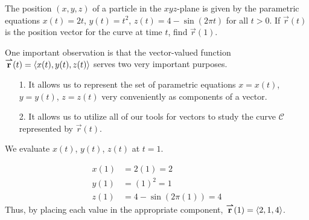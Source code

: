 \documentclass[noauthor, handout]{ximera}
\begin{document}
\begin{problem}
The position $(x,y,z)$ of a particle in the $xyz$-plane is given by the parametric equations $x(t) = 2t$, $y(t) = t^2$, $z(t)=4-\sin(2 \pi t)$ for all $t > 0$.  If $\vec{r}(t)$ is the position vector for the curve at time $t$, find $\vec{r}(1)$.

\begin{freeResponse}
One important observation is that the vector-valued function ${\overset{\boldsymbol{\rightharpoonup}}{\mathbf{r}}}(t) = \left\langle x(t),y(t),z(t)\right\rangle$ serves two very important purposes.\begin{itemize}
\item[1.] It allows us to represent the set of parametric equations $x=x(t)$, $y=y(t)$, $z=z(t)$ very conveniently as components of a vector.
\item[2.] It allows us to utilize all of our tools for vectors to study the curve $\mathcal{C}$ represented by $\vec{r}(t)$. 
\end{itemize}

We evaluate $x(t)$, $y(t)$, $z(t)$ at $t=1$.

\begin{align*}
x(1) &= 2(1) = 2 \\
y(1) &= (1)^2=1 \\
z(1) &= 4-\sin(2\pi(1)) = 4
\end{align*}
Thus, by placing each value in the appropriate component, ${\overset{\boldsymbol{\rightharpoonup}}{\mathbf{r}}}(1) = \left\langle 2,1,4\right\rangle$.
\end{freeResponse}

\end{problem}

\end{document}

